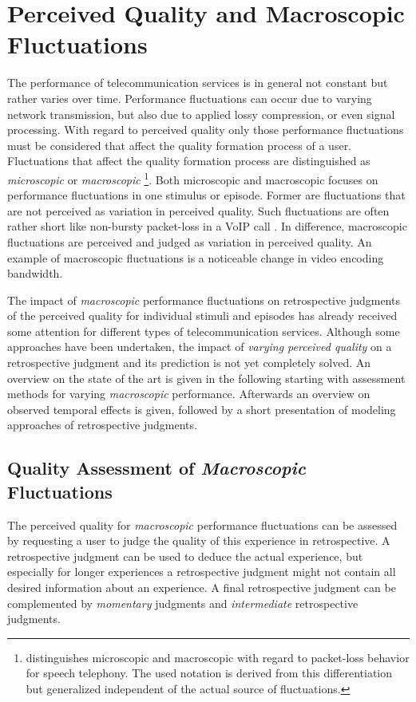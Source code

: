 \section{Perceived Quality and Macroscopic Fluctuations}\label{chap:04}
The performance of telecommunication services is in general not constant but rather varies over time.
Performance fluctuations can occur due to varying network transmission, but also due to applied lossy compression, or even signal processing.
With regard to perceived quality only those performance fluctuations must be considered that affect the quality formation process of a user.
Fluctuations that affect the quality formation process are distinguished as \emph{microscopic} or \emph{macroscopic} \citep[\cf,][p. 72]{raake_short-_2006}
\footnote{\citet{raake_short-_2006} distinguishes microscopic and macroscopic with regard to packet-loss behavior for speech telephony. The used notation is derived from this differentiation but generalized independent of the actual source of fluctuations.}.
Both microscopic and macroscopic focuses on performance fluctuations in one stimulus or episode.
Former are fluctuations that are not perceived as variation in perceived quality.
Such fluctuations are often rather short like non-bursty packet-loss in a \ac{VoIP} call \citep[\cf,][p. 72]{raake_short-_2006}.
In difference, macroscopic fluctuations are perceived and judged as variation in perceived quality.
An example of macroscopic fluctuations is a noticeable change in video encoding bandwidth.

The impact of \emph{macroscopic} performance fluctuations on retrospective judgments of the perceived quality for individual stimuli and episodes has already received some attention for different types of telecommunication services.
Although some approaches have been undertaken, the impact of \emph{varying perceived quality} on a retrospective judgment and its prediction is not yet completely solved.
An overview on the state of the art is given in the following starting with assessment methods for varying \emph{macroscopic} performance.
Afterwards an overview on observed temporal effects is given, followed by a short presentation of modeling approaches of retrospective judgments.

\subsection{Quality Assessment of \emph{Macroscopic} Fluctuations}
The perceived quality for \emph{macroscopic} performance fluctuations can be assessed by requesting a user to judge the quality of this experience in retrospective.
A retrospective judgment can be used to deduce the actual experience, but especially for longer experiences a retrospective judgment might not contain all desired information about an experience.
A final retrospective judgment can be complemented by \emph{momentary} judgments and \emph{intermediate} retrospective judgments.

